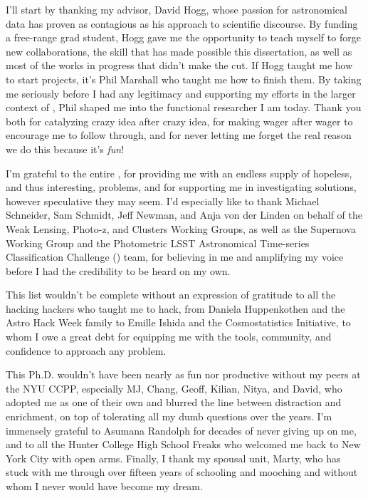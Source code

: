 I'll start by thanking my advisor, David Hogg, whose passion for astronomical data has proven as contagious as his approach to scientific discourse.
By funding a free-range grad student, Hogg gave me the opportunity to teach myself to forge new collaborations, the skill that has made possible this dissertation, as well as most of the works in progress that didn't make the cut.
If Hogg taught me how to start projects, it's Phil Marshall who taught me how to finish them.
By taking me seriously before I had any legitimacy and supporting my efforts in the larger context of \desc, Phil shaped me into the functional researcher I am today.
Thank you both for catalyzing crazy idea after crazy idea, for making wager after wager to encourage me to follow through, and for never letting me forget the real reason we do this \textemdash because it's \textit{fun}!

I'm grateful to the entire \desc, for providing me with an endless supply of hopeless, and thus interesting, problems, and for supporting me in investigating solutions, however speculative they may seem. 
I'd especially like to thank Michael Schneider, Sam Schmidt, Jeff Newman, and Anja von der Linden on behalf of the Weak Lensing, Photo-z, and Clusters Working Groups, as well as the Supernova Working Group and the Photometric LSST Astronomical Time-series Classification Challenge () team, for believing in me and amplifying my voice before I had the credibility to be heard on my own.

This list wouldn't be complete without an expression of gratitude to all the hacking hackers who taught me to hack, from Daniela Huppenkothen and the Astro Hack Week family to Emille Ishida and the Cosmostatistics Initiative, to whom I owe a great debt for equipping me with the tools, community, and confidence to approach any problem.


This Ph.D. wouldn't have been nearly as fun nor productive without my peers at the NYU CCPP, especially MJ, Chang, Geoff, Kilian, Nitya, and David, who adopted me as one of their own and blurred the line between distraction and enrichment, on top of tolerating all my dumb questions over the years.
I'm immensely grateful to Asumana Randolph for decades of never giving up on me, and to all the Hunter College High School Freaks who welcomed me back to New York City with open arms.
Finally, I thank my spousal unit, Marty, who has stuck with me through over fifteen years of schooling and mooching and without whom I never would have become my dream.
